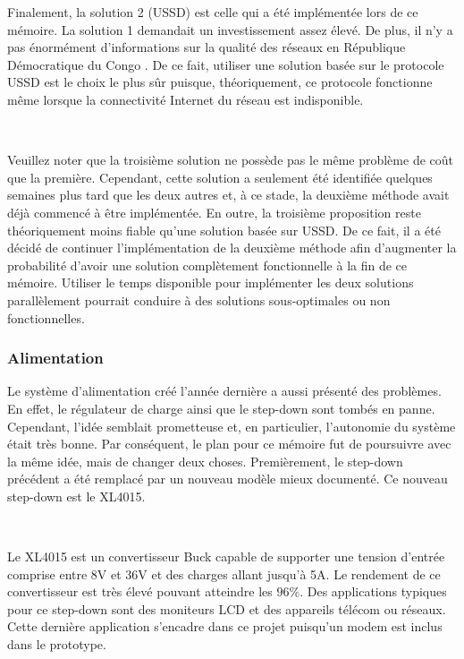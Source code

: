 \noindent
Finalement, la solution 2 (USSD) est celle qui a été implémentée lors de ce mémoire. La solution 1 demandait un investissement assez élevé. De plus, il n'y a pas énormément d'informations sur la qualité des réseaux en République Démocratique du Congo \cite{congo_tower}. De ce fait, utiliser une solution basée sur le protocole USSD est le choix le plus sûr puisque, théoriquement, ce protocole fonctionne même lorsque la connectivité Internet du réseau est indisponible.

~

\noindent
Veuillez noter que la troisième solution ne possède pas le même problème de coût que la première. Cependant, cette solution a seulement été identifiée quelques semaines plus tard que les deux autres et, à ce stade, la deuxième méthode avait déjà commencé à être implémentée. En outre, la troisième proposition reste théoriquement moins fiable qu'une solution basée sur USSD. De ce fait, il a été décidé de continuer l'implémentation de la deuxième méthode afin d'augmenter la probabilité d'avoir une solution complètement fonctionnelle à la fin de ce mémoire. Utiliser le temps disponible pour implémenter les deux solutions parallèlement pourrait conduire à des solutions sous-optimales ou non fonctionnelles.

\subsubsection{Alimentation}

\noindent
Le système d'alimentation créé l'année dernière a aussi présenté des problèmes. En effet, le régulateur de charge ainsi que le step-down sont tombés en panne. Cependant, l'idée semblait prometteuse et, en particulier, l'autonomie du système était très bonne. Par conséquent, le plan pour ce mémoire fut de poursuivre avec la même idée, mais de changer deux choses. Premièrement, le step-down précédent a été remplacé par un nouveau modèle mieux documenté. Ce nouveau step-down est le XL4015.

~

\noindent
Le XL4015 est un convertisseur Buck capable de supporter une tension d'entrée comprise entre 8V et 36V et des charges allant jusqu'à 5A. Le rendement de ce convertisseur est très élevé pouvant atteindre les $96\%$. Des applications typiques pour ce step-down sont des moniteurs LCD et des appareils télécom ou réseaux. Cette dernière application s'encadre dans ce projet puisqu'un modem est inclus dans le prototype.


